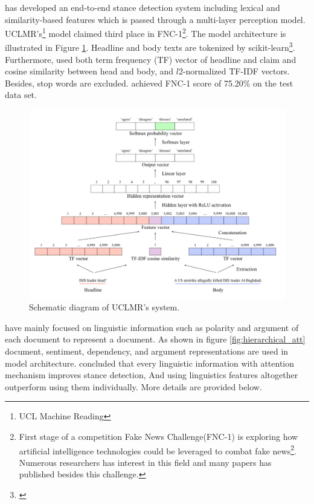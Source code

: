 	 \cite{UCLMR} has developed an end-to-end stance detection system including lexical and similarity-based features which is passed through a multi-layer perception model. UCLMR's\footnote{UCL Machine Reading} model claimed third place in FNC-1\footnote{First stage of a competition Fake News Challenge(FNC-1) is exploring how artificial intelligence technologies could be leveraged to combat fake news\footnote{fakenewschallenge.org}. Numerous researchers has interest in this field and many papers has published besides this challenge.}. The model architecture is illustrated in Figure \ref{fig:UCLMR-system}. Headline and body texts are tokenized by scikit-learn\footnote{\cite{sikit-learn}}. Furthermore, \cite{UCLMR} used both term frequency (TF) vector of headline and claim and cosine similarity between head and body, and $l$2-normalized TF-IDF vectors. Besides, stop words are excluded. \cite{UCLMR} achieved FNC-1 score of 75.20\% on the test data set.
	\begin{figure}
		\centering
		\includegraphics[scale=0.4]{statistics/stance/simple-baseline-FNC.png}
		\caption{Schematic diagram of UCLMR’s system.}
		\label{fig:UCLMR-system}
	\end{figure}


	\cite{Hierarchical-Attention-Network} have mainly focused on linguistic information such as polarity and argument of each document to represent a document. As shown in figure \ref{fig:hierarchical_att} document, sentiment, dependency, and argument representations are used in model architecture. \cite{Hierarchical-Attention-Network} concluded that every linguistic information with attention mechanism improves stance detection, And using linguistics features altogether outperform using them individually. More details are provided below.
	
